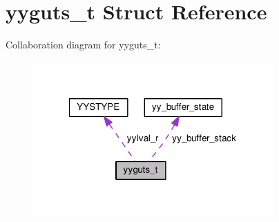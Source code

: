 \hypertarget{structyyguts__t}{\section{yyguts\-\_\-t Struct Reference}
\label{structyyguts__t}
}


Collaboration diagram for yyguts\-\_\-t\-:\nopagebreak
\begin{figure}[H]
\begin{center}
\leavevmode
\includegraphics[width=261pt]{structyyguts__t__coll__graph}
\end{center}
\end{figure}
